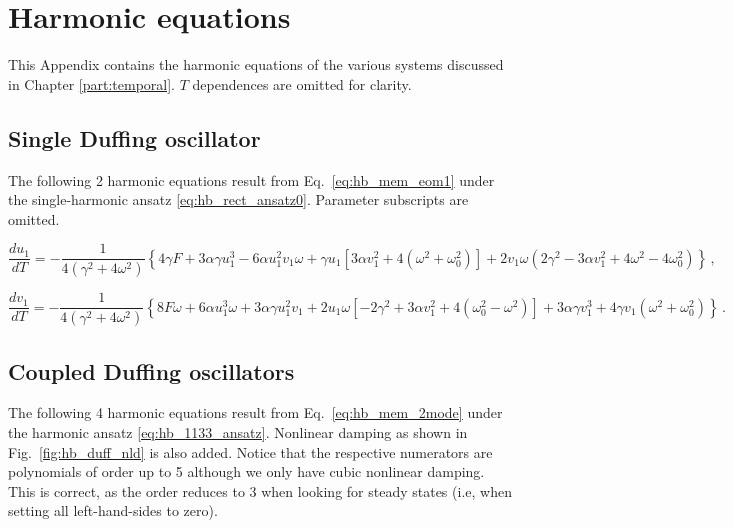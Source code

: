 
\chapter{Harmonic equations} \label{app:harmeqs}

This Appendix contains the harmonic equations of the various systems discussed in Chapter \ref{part:temporal}. $T$ dependences are omitted for clarity. 	

\section{Single Duffing oscillator} \label{app:harmeqs_11}

The following 2 harmonic equations result from Eq.~\eqref{eq:hb_mem_eom1} under the single-harmonic ansatz \eqref{eq:hb_rect_ansatz0}. Parameter subscripts are omitted. 

\begin{dmath}
\frac{d u_1}{dT} = -\frac{1}{4 \left(\gamma ^2+4 \omega ^2\right)} \left\{4 \gamma  F+3 \alpha  \gamma  u_1^3-6 \alpha  u_1^2 v_1 \omega +\gamma  u_1 \left[3 \alpha  v_1^2+4 \left(\omega ^2+\omega_0^2\right)\right]+2 v_1 \omega  \left(2 \gamma ^2-3 \alpha  v_1^2+4 \omega ^2-4 \omega_0^2\right) \right\} \,,
\end{dmath}

\begin{dmath}	
\frac{d v_1}{dT} = -\frac{1}{4 \left(\gamma ^2+4 \omega ^2\right)} \left\{8 F \omega +6 \alpha  u_1^3 \omega +3 \alpha  \gamma  u_1^2 v_1+2 u_1 \omega  \left[-2 \gamma ^2+3 \alpha  v_1^2  + 4 \left(\omega_0^2 - \omega^2 \right) \right]+3 \alpha  \gamma  v_1^3+4 \gamma  v_1 \left(\omega ^2+\omega_0^2\right) \right\} \,.
\end{dmath}

\section{Coupled Duffing oscillators} \label{app:harmeqs_1133}

The following 4 harmonic equations result from Eq.~\eqref{eq:hb_mem_2mode} under the harmonic ansatz \eqref{eq:hb_1133_ansatz}. Nonlinear damping as shown in Fig.~\ref{fig:hb_duff_nld} is also added. Notice that the respective numerators are polynomials of order up to 5 although we only have cubic nonlinear damping. This is correct, as the order reduces to 3 when looking for steady states (i.e, when setting all left-hand-sides to zero). 

